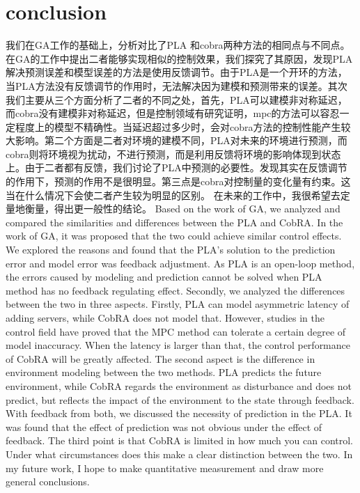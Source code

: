 \documentclass[sigconf]{acmart}
\begin{document}
\section{conclusion}
我们在GA工作的基础上，分析对比了PLA 和cobra两种方法的相同点与不同点。在GA的工作中提出二者能够实现相似的控制效果，我们探究了其原因，发现PLA解决预测误差和模型误差的方法是使用反馈调节。由于PLA是一个开环的方法，当PLA方法没有反馈调节的作用时，无法解决因为建模和预测带来的误差。其次我们主要从三个方面分析了二者的不同之处，首先，PLA可以建模非对称延迟，而cobra没有建模非对称延迟，但是控制领域有研究证明，mpc的方法可以容忍一定程度上的模型不精确性。当延迟超过多少时，会对cobra方法的控制性能产生较大影响。第二个方面是二者对环境的建模不同，PLA对未来的环境进行预测，而cobra则将环境视为扰动，不进行预测，而是利用反馈将环境的影响体现到状态上。由于二者都有反馈，我们讨论了PLA中预测的必要性。发现其实在反馈调节的作用下，预测的作用不是很明显。第三点是cobra对控制量的变化量有约束。这当在什么情况下会使二者产生较为明显的区别。
在未来的工作中，我很希望去定量地衡量，得出更一般性的结论。
Based on the work of GA, we analyzed and compared the similarities and differences between the PLA and CobRA.
In the work of GA, it was proposed that the two could achieve similar control effects. We explored the reasons and found that the PLA's solution to the prediction error and model error was feedback adjustment.
As PLA is an open-loop method, the errors caused by modeling and prediction cannot be solved when PLA method has no feedback regulating effect.
Secondly, we analyzed the differences between the two in three aspects. Firstly, PLA can model asymmetric latency of adding servers, while CobRA does not model that. However, studies in the control field have proved that the MPC method can tolerate a certain degree of model inaccuracy.
When the latency is larger than that, the control performance of CobRA will be greatly affected.
The second aspect is the difference in environment modeling between the two methods. PLA predicts the future environment, while CobRA regards the environment as disturbance and does not predict, but reflects the impact of the environment to the state through feedback.
With feedback from both, we discussed the necessity of prediction in the PLA.
It was found that the effect of prediction was not obvious under the effect of feedback.
The third point is that CobRA is limited in how much you can control.
Under what circumstances does this make a clear distinction between the two.
In my future work, I hope to make quantitative measurement and draw more general conclusions.


\end{document}
